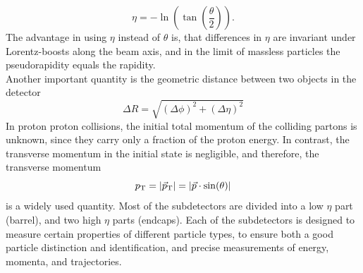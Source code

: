 \begin{equation}
 \eta=-\ln\left(\tan\left(\frac{\theta}{2}\right)\right).
\end{equation}
The advantage in using $\eta$ instead of $\theta$ is, that differences in $\eta$ are invariant under Lorentz-boosts along the beam axis, and in the limit of massless particles the pseudorapidity equals the rapidity.\\
Another important quantity is the geometric distance between two objects in the detector
\begin{equation}
 \Delta R = \sqrt{(\Delta\phi)^2 + (\Delta\eta)^2}
\end{equation}
In proton proton collisions, the initial total momentum of the colliding partons is unknown, since they carry only a fraction of the proton energy. In contrast, the transverse momentum in the initial state is negligible, and therefore, the transverse momentum
\begin{equation}
 p_{\mathrm{T}}=|{\vec p}_{\mathrm{T}}|=|\vec{p}\cdot\sin(\theta)|
\end{equation}
is a widely used quantity.
Most of the subdetectors are divided into a low $\eta$ part (barrel), and two high $\eta$ parts (endcaps). Each of the subdetectors is designed to measure certain properties of different particle types, to ensure both a good particle distinction and identification, and precise measurements of energy, momenta, and trajectories.




